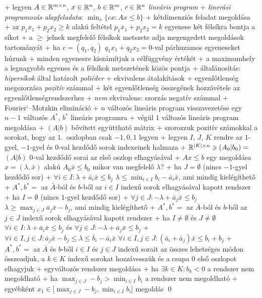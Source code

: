 + legyen $A \in \mathbb{R}^{m \times n}$, $x \in \mathbb{R}^n$, $b \in \mathbb{R}^m$, $c \in
  \mathbb{R}^n$ \RA \emph{lineáris program}
+ \dfn \emph{linerási programozás alapfeladata}: $\min_{x} \{ cx : Ax
  \le b \}$
+ kétdimenziós feladat megoldása
  + az $p_1 x_1 + p_2 x_2 \ge k$ alakú feltétel $p_1 x_1 + p_2
  x_2 = k$ egyenese két félsíkra bontja a síkot
    + a $\ge$ jelnek megfelelő félsíkok metszete adja megengedett
      megoldások tartományát
  + ha $c = (q_1, q_2)$ \RA $q_1 x_1 + q_2 x_2 = 0$-val párhuzamos
  egyeneseket húzunk
    + minden egyenesre kiszámítjuk a célfüggvény értékét
    + a maximumhely a legnagyobb egyenes és a félsíkok metszetének
    közös pontja
  + általánosítás: \emph{hipersíkok} által határolt \emph{poliéder}
+ ekvivalens átalakítások
  + egyenlőtlenség megszorzása \emph{pozitív} számmal
  + két egyenlőtlenség összegének hozzávétele az egyenlőtlenségrendszerhez
  + \emph{nem} ekvivalens: szorzás negatív számmal
+ \alg Fourier`--Motzkin elimináció
  + $n$ változós lineáris program visszavezetése egy $n - 1$ változós
    $A^*$, $b^*$ lineáris programra
  + végül $1$ változós lineáris program megoldása
  + $(A|b)$ bővített együttható mátrix
    + szorozzuk pozitív számokkal a
      sorokat, hogy az $1$.~oszlopban csak $-1, 0, 1$ legyen
  + legyen $I$, $J$, $K$ rendre az $1$-gyel, $-1$-gyel és $0$-val
    kezdődő sorok indexeinek halmaza
  + $\mathbb{R}^{\lvert K \rvert \times n} \ni (A_0|b_0) =$ $(A|b)$ $0$-val
    kezdődő sorai az első oszlop elhagyásával
  + $Ax \le b$ egy megoldása $x = (\lambda, \bar{x})$ alakú \RA $A_0
    \bar{x} \le b_0$ \RA mikor van megfelelő $\lambda$?
  + ha $J = \emptyset$ (nincs $-1$-gyel kezdődő sor)
    + $\forall i \in I : \lambda + \bar{a}_i \bar{x} \le b_j$ \RA
      $\lambda \le \min_{i \in I} b_i - \bar{a}_i \bar{x}$, ami mindig
      kielégíthető
    + $A^*, b^* =$ az $\bar{A}$-ból és $b$-ből az $i \in I$ indexű sorok
      elhagyásával kapott rendszer
  + ha $I = \emptyset$ (nincs $1$-gyel kezdődő sor)
    + $\forall j \in J : -\lambda + \bar{a}_j \bar{x} \le b_j$ \RA
      $\lambda \ge \max_{j \in J} \bar{a}_j \bar{x} - b_j$, ami mindig
      kielégíthető
    + $A^*, b^* =$ az $\bar{A}$-ból és $b$-ből az $j \in J$ indexű sorok
      elhagyásával kapott rendszer
  + ha $I \ne \emptyset$ és $J \ne \emptyset$ \RA
    $\forall i \in I : \lambda + \bar{a}_i \bar{x} \le b_j$ és
    $\forall j \in J : -\lambda + \bar{a}_j \bar{x} \le b_j$
    + $\forall i \in I, j \in J: \bar{a}_j \bar{x} - b_j \le \lambda
      \le \bar{b}_i - \bar{a}_i \bar{x}$ \RA $\forall i \in I, j \in J:
      (\bar{a}_i + \bar{a}_j) \bar{x} \le b_i + b_j$
    + $A^*, b^* =$ az $\bar{A}$ és $b$-ből $i \in I$ és $j \in J$
      indexű sorait az összes lehetséges módon összeadjuk, a $k \in K$
      indexű sorokat hozzávesszük és a csupa $0$ első oszlopot
      elhagyjuk
  + egyváltozós rendszer megoldása
    + ha $\exists k \in K : b_k < 0$ \RA a rendszer nem megoldható
    + ha $\max_{j \in J} -b_j > \min_{i \in I} b_i$ \RA a rendszer nem
      megoldható
    + egyébként \RA $x_1 \in \bigl[\max_{j \in J} -b_j, \min_{i \in I}
      b_i\bigr]$ megoldás \qed

